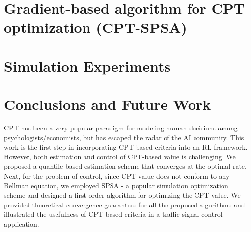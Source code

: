 \documentclass{article}
\begin{document}
\section{Gradient-based algorithm for CPT optimization (CPT-SPSA)}
\label{sec:1spsa}


\section{Simulation Experiments}
\label{sec:expts}





\section{Conclusions and Future Work}
\label{sec:conclusions}
CPT has been a very popular paradigm for modeling human decisions among psychologists/economists, but has escaped the radar of the AI community. This work is the first step in incorporating CPT-based criteria into an RL framework. However, both estimation and control of CPT-based value is challenging. 
We proposed a quantile-based estimation scheme that converges at the optimal rate. Next, for the problem of control, since CPT-value does not conform to any Bellman equation, we employed SPSA - a popular simulation optimization scheme and designed a first-order algorithm for optimizing the CPT-value. 
We provided theoretical convergence guarantees for all the proposed algorithms and illustrated the usefulness of CPT-based criteria in a traffic signal control application.
\end{document}
